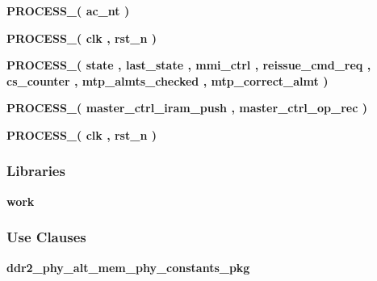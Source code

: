 \begin{DoxyCompactItemize}
\item 
{\bf P\+R\+O\+C\+E\+S\+S\+\_}{\bfseries  ( {\bfseries {\bfseries {\bf ac\+\_\+nt}} \textcolor{vhdlchar}{ }} )}
\item 
{\bf P\+R\+O\+C\+E\+S\+S\+\_}{\bfseries  ( {\bfseries {\bfseries {\bf clk}} \textcolor{vhdlchar}{ }} , {\bfseries {\bfseries {\bf rst\+\_\+n}} \textcolor{vhdlchar}{ }} )}
\item 
{\bf P\+R\+O\+C\+E\+S\+S\+\_}{\bfseries  ( {\bfseries {\bfseries {\bf state}} \textcolor{vhdlchar}{ }} , {\bfseries {\bfseries {\bf last\+\_\+state}} \textcolor{vhdlchar}{ }} , {\bfseries {\bfseries {\bf mmi\+\_\+ctrl}} \textcolor{vhdlchar}{ }} , {\bfseries {\bfseries {\bf reissue\+\_\+cmd\+\_\+req}} \textcolor{vhdlchar}{ }} , {\bfseries {\bfseries {\bf cs\+\_\+counter}} \textcolor{vhdlchar}{ }} , {\bfseries {\bfseries {\bf mtp\+\_\+almts\+\_\+checked}} \textcolor{vhdlchar}{ }} , {\bfseries {\bfseries {\bf mtp\+\_\+correct\+\_\+almt}} \textcolor{vhdlchar}{ }} )}
\item 
{\bf P\+R\+O\+C\+E\+S\+S\+\_}{\bfseries  ( {\bfseries {\bfseries {\bf master\+\_\+ctrl\+\_\+iram\+\_\+push}} \textcolor{vhdlchar}{ }} , {\bfseries {\bfseries {\bf master\+\_\+ctrl\+\_\+op\+\_\+rec}} \textcolor{vhdlchar}{ }} )}
\item 
{\bf P\+R\+O\+C\+E\+S\+S\+\_}{\bfseries  ( {\bfseries {\bfseries {\bf clk}} \textcolor{vhdlchar}{ }} , {\bfseries {\bfseries {\bf rst\+\_\+n}} \textcolor{vhdlchar}{ }} )}
\end{DoxyCompactItemize}
\subsubsection*{Libraries}
 \begin{DoxyCompactItemize}
\item 
{\bf work} 
\end{DoxyCompactItemize}
\subsubsection*{Use Clauses}
 \begin{DoxyCompactItemize}
\item 
{\bf ddr2\+\_\+phy\+\_\+alt\+\_\+mem\+\_\+phy\+\_\+constants\+\_\+pkg}   
\end{DoxyCompactItemize}
